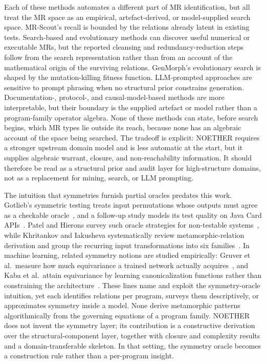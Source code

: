 \documentclass[manuscript]{acmart}
\begin{document}
Each of these methods automates a different part of MR identification, but all treat the MR space as an empirical, artefact-derived, or model-supplied search space. MR-Scout's recall is bounded by the relations already latent in existing tests. Search-based and evolutionary methods can discover useful numerical or executable MRs, but the reported cleansing and redundancy-reduction steps follow from the search representation rather than from an account of the mathematical origin of the surviving relations. GenMorph's evolutionary search is shaped by the mutation-killing fitness function. LLM-prompted approaches are sensitive to prompt phrasing when no structural prior constrains generation. Documentation-, protocol-, and causal-model-based methods are more interpretable, but their boundary is the supplied artefact or model rather than a program-family operator algebra. None of these methods can state, before search begins, which MR types lie outside its reach, because none has an algebraic account of the space being searched. The tradeoff is explicit: NOETHER requires a stronger upstream domain model and is less automatic at the start, but it supplies algebraic warrant, closure, and non-reachability information. It should therefore be read as a structural prior and audit layer for high-structure domains, not as a replacement for mining, search, or LLM prompting.

The intuition that symmetries furnish partial oracles predates this work. Gotlieb's symmetric testing treats input permutations whose outputs must agree as a checkable oracle~\cite{Gotlieb2003Symmetries}, and a follow-up study models its test quality on Java Card APIs~\cite{GotliebBernard2006}. Patel and Hierons survey such oracle strategies for non-testable systems~\cite{PatelHierons2018}, while Khritankov and Iakusheva systematically review metamorphic-relation derivation and group the recurring input transformations into six families~\cite{KhritankovIakusheva2024}. In machine learning, related symmetry notions are studied empirically: Gruver et al.\ measure how much equivariance a trained network actually acquires~\cite{Gruver2023LieDerivative}, and Kaba et al.\ attain equivariance by learning canonicalization functions rather than constraining the architecture~\cite{Kaba2023Canonicalization}. These lines name and exploit the symmetry-oracle intuition, yet each identifies relations per program, surveys them descriptively, or approximates symmetry inside a model. None derive metamorphic patterns algorithmically from the governing equations of a program family. NOETHER does not invent the symmetry layer; its contribution is a constructive derivation over the structural-component layer, together with closure and complexity results and a domain-transferable skeleton. In that setting, the symmetry oracle becomes a construction rule rather than a per-program insight.
\end{document}
